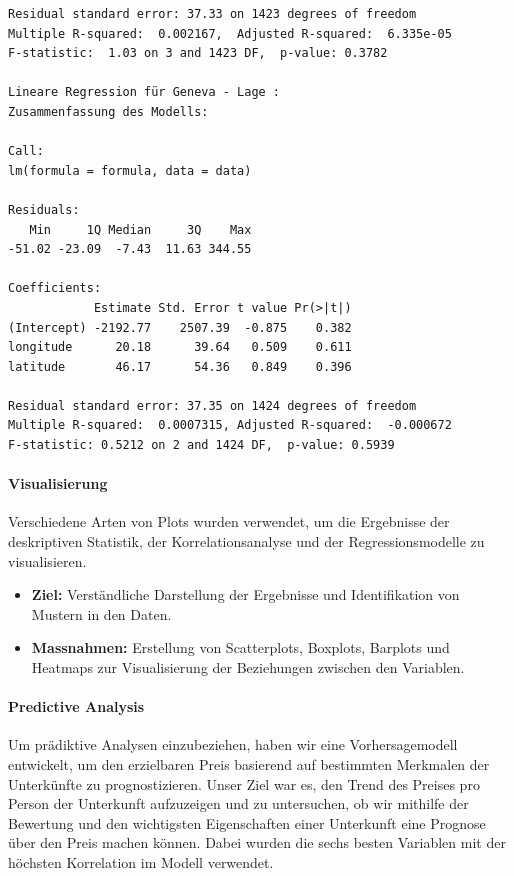 \documentclass[
  journal,
]{IEEEtran}%
\let\oldparagraph\paragraph
\renewcommand{\paragraph}[1]{\oldparagraph{#1}\mbox{}}
\begin{document}
\begin{verbatim}
Residual standard error: 37.33 on 1423 degrees of freedom
Multiple R-squared:  0.002167,  Adjusted R-squared:  6.335e-05 
F-statistic:  1.03 on 3 and 1423 DF,  p-value: 0.3782

Lineare Regression für Geneva - Lage :
Zusammenfassung des Modells:

Call:
lm(formula = formula, data = data)

Residuals:
   Min     1Q Median     3Q    Max 
-51.02 -23.09  -7.43  11.63 344.55 

Coefficients:
            Estimate Std. Error t value Pr(>|t|)
(Intercept) -2192.77    2507.39  -0.875    0.382
longitude      20.18      39.64   0.509    0.611
latitude       46.17      54.36   0.849    0.396

Residual standard error: 37.35 on 1424 degrees of freedom
Multiple R-squared:  0.0007315, Adjusted R-squared:  -0.000672 
F-statistic: 0.5212 on 2 and 1424 DF,  p-value: 0.5939
\end{verbatim}

\hypertarget{visualisierung}{%
\paragraph{\texorpdfstring{\textbf{Visualisierung}}{Visualisierung}}\label{visualisierung}}

Verschiedene Arten von Plots wurden verwendet, um die Ergebnisse der
deskriptiven Statistik, der Korrelationsanalyse und der
Regressionsmodelle zu visualisieren.

\begin{itemize}
\item
  \textbf{Ziel:} Verständliche Darstellung der Ergebnisse und
  Identifikation von Mustern in den Daten.
\item
  \textbf{Massnahmen:} Erstellung von Scatterplots, Boxplots, Barplots
  und Heatmaps zur Visualisierung der Beziehungen zwischen den
  Variablen.
\end{itemize}

\hypertarget{predictive-analysis}{%
\paragraph{Predictive Analysis}\label{predictive-analysis}}

Um prädiktive Analysen einzubeziehen, haben wir eine Vorhersagemodell
entwickelt, um den erzielbaren Preis basierend auf bestimmten Merkmalen
der Unterkünfte zu prognostizieren. Unser Ziel war es, den Trend des
Preises pro Person der Unterkunft aufzuzeigen und zu untersuchen, ob wir
mithilfe der Bewertung und den wichtigsten Eigenschaften einer
Unterkunft eine Prognose über den Preis machen können. Dabei wurden die
sechs besten Variablen mit der höchsten Korrelation im Modell verwendet.
\end{document}
